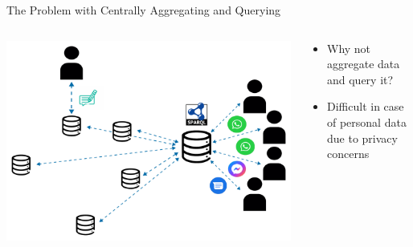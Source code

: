 \begin{frame}{The Problem with Centrally Aggregating and Querying}
    \begin{columns}[T] %
        \begin{column}{0.6\textwidth} %
            \includegraphics[width=\linewidth]{images/centralize-personal-data-stores.pdf} %
        \end{column}

        \begin{column}{0.4\textwidth} %
            \begin{itemize}
                \item Why not aggregate data and query it?
                \item Difficult in case of personal data due to privacy concerns
            \end{itemize}
        \end{column}
    \end{columns}
\end{frame}

